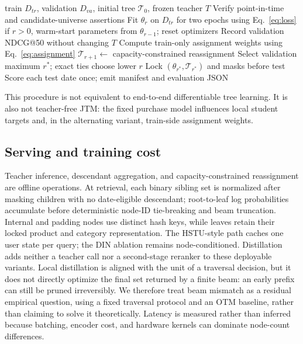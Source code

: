 \documentclass[sigconf,natbib=true]{acmart}
\begin{document}
\begin{algorithm}[t]
\caption{Registered PTD training and tree lock}
\label{alg:ptd}
\begin{algorithmic}[1]
\Require train $D_{tr}$, validation $D_{va}$, initial tree $\mathcal{T}_0$, frozen teacher $T$
\State Verify point-in-time and candidate-universe assertions
  \State Fit $\theta_r$ on $D_{tr}$ for two epochs using Eq.~\ref{eq:loss}
  \Statex \hspace{\algorithmicindent}if $r>0$, warm-start parameters from $\theta_{r-1}$; reset optimizers
  \State Record validation NDCG@50 without changing $T$
    \State Compute train-only assignment weights using Eq.~\ref{eq:assignment}
    \State $\mathcal{T}_{r+1}\gets$ capacity-constrained reassignment
  \EndIf
\EndFor
\State Select validation maximum $r^*$; exact ties choose lower $r$
\State Lock $(\theta_{r^*},\mathcal{T}_{r^*})$ and masks before test
\State Score each test date once; emit manifest and evaluation JSON
\end{algorithmic}
\end{algorithm}

This procedure is not equivalent to end-to-end differentiable tree learning. It is also not teacher-free JTM: the fixed purchase model influences local student targets and, in the alternating variant, train-side assignment weights.

\subsection{Serving and training cost}
Teacher inference, descendant aggregation, and capacity-constrained reassignment are offline operations. At retrieval, each binary sibling set is normalized after masking children with no date-eligible descendant; root-to-leaf log probabilities accumulate before deterministic node-ID tie-breaking and beam truncation. Internal and padding nodes use distinct hash keys, while leaves retain their locked product and category representation. The HSTU-style path caches one user state per query; the DIN ablation remains node-conditioned. Distillation adds neither a teacher call nor a second-stage reranker to these deployable variants. Local distillation is aligned with the unit of a traversal decision, but it does not directly optimize the final set returned by a finite beam: an early prefix can still be pruned irreversibly. We therefore treat beam mismatch as a residual empirical question, using a fixed traversal protocol and an OTM baseline, rather than claiming to solve it theoretically. Latency is measured rather than inferred because batching, encoder cost, and hardware kernels can dominate node-count differences.
\end{document}
